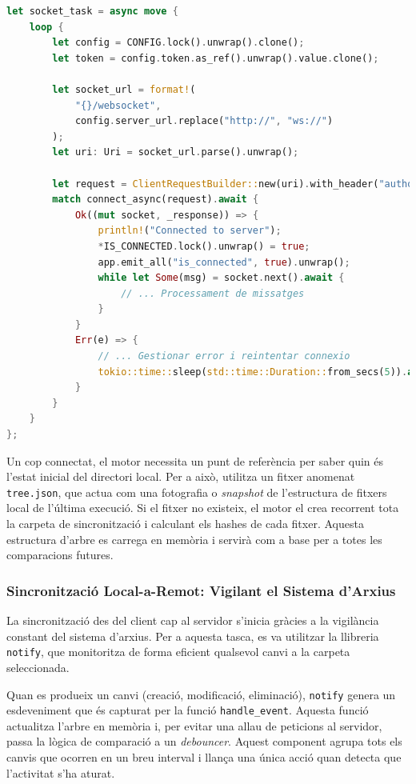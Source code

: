 \begin{lstlisting}[language=rust, caption={Establiment de la connexió WebSocket a \texttt{synchronizer.rs}}]
let socket_task = async move {
    loop {
        let config = CONFIG.lock().unwrap().clone();
        let token = config.token.as_ref().unwrap().value.clone();

        let socket_url = format!(
            "{}/websocket",
            config.server_url.replace("http://", "ws://")
        );
        let uri: Uri = socket_url.parse().unwrap();

        let request = ClientRequestBuilder::new(uri).with_header("authorization", &token);
        match connect_async(request).await {
            Ok((mut socket, _response)) => {
                println!("Connected to server");
                *IS_CONNECTED.lock().unwrap() = true;
                app.emit_all("is_connected", true).unwrap();
                while let Some(msg) = socket.next().await {
                    // ... Processament de missatges
                }
            }
            Err(e) => {
                // ... Gestionar error i reintentar connexio
                tokio::time::sleep(std::time::Duration::from_secs(5)).await;
            }
        }
    }
};
\end{lstlisting}

Un cop connectat, el motor necessita un punt de referència per saber quin és l'estat inicial del directori local. Per a això, utilitza un fitxer anomenat \texttt{tree.json}, que actua com una fotografia o \textit{snapshot} de l'estructura de fitxers local de l'última execució. Si el fitxer no existeix, el motor el crea recorrent tota la carpeta de sincronització i calculant els hashes de cada fitxer. Aquesta estructura d'arbre es carrega en memòria i servirà com a base per a totes les comparacions futures.

\subsubsection{Sincronització Local-a-Remot: Vigilant el Sistema d'Arxius}
La sincronització des del client cap al servidor s'inicia gràcies a la vigilància constant del sistema d'arxius. Per a aquesta tasca, es va utilitzar la llibreria \texttt{notify}, que monitoritza de forma eficient qualsevol canvi a la carpeta seleccionada.

Quan es produeix un canvi (creació, modificació, eliminació), \texttt{notify} genera un esdeveniment que és capturat per la funció \texttt{handle\_event}. Aquesta funció actualitza l'arbre en memòria i, per evitar una allau de peticions al servidor, passa la lògica de comparació a un \textit{debouncer}. Aquest component agrupa tots els canvis que ocorren en un breu interval i llança una única acció quan detecta que l'activitat s'ha aturat.

